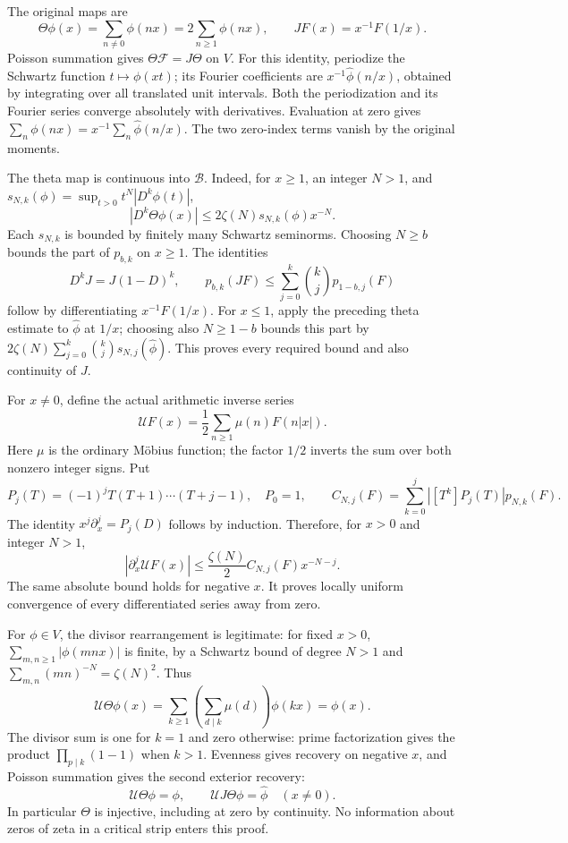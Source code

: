 \documentclass[
  11pt,
]{article}
\begin{document}
The original maps are \[
\Theta\phi(x)=\sum_{n\ne0}\phi(nx)=2\sum_{n\ge1}\phi(nx),
\qquad JF(x)=x^{-1}F(1/x).
\] Poisson summation gives \(\Theta\mathcal F=J\Theta\) on \(V\). For
this identity, periodize the Schwartz function \(t\mapsto\phi(xt)\); its
Fourier coefficients are \(x^{-1}\widehat\phi(n/x)\), obtained by
integrating over all translated unit intervals. Both the periodization
and its Fourier series converge absolutely with derivatives. Evaluation
at zero gives \(\sum_n\phi(nx)=x^{-1}\sum_n\widehat\phi(n/x)\). The two
zero-index terms vanish by the original moments.

The theta map is continuous into \(\mathscr B\). Indeed, for \(x\ge1\),
an integer \(N>1\), and \(s_{N,k}(\phi)=\sup_{t>0}t^N|D^k\phi(t)|\), \[
|D^k\Theta\phi(x)|
\le2\zeta(N)s_{N,k}(\phi)x^{-N}.
\] Each \(s_{N,k}\) is bounded by finitely many Schwartz seminorms.
Choosing \(N\ge b\) bounds the part of \(p_{b,k}\) on \(x\ge1\). The
identities \[
D^kJ=J(1-D)^k,\qquad
p_{b,k}(JF)\le\sum_{j=0}^k\binom{k}{j}p_{1-b,j}(F)
\] follow by differentiating \(x^{-1}F(1/x)\). For \(x\le1\), apply the
preceding theta estimate to \(\widehat\phi\) at \(1/x\); choosing also
\(N\ge1-b\) bounds this part by
\(2\zeta(N)\sum_{j=0}^k\binom{k}{j}s_{N,j}(\widehat\phi)\). This proves
every required bound and also continuity of \(J\).

For \(x\ne0\), define the actual arithmetic inverse series \[
\mathcal UF(x)=\frac12\sum_{n\ge1}\mu(n)F(n|x|).
\] Here \(\mu\) is the ordinary Möbius function; the factor \(1/2\)
inverts the sum over both nonzero integer signs. Put \[
P_j(T)=(-1)^jT(T+1)\cdots(T+j-1),\quad P_0=1,\qquad
C_{N,j}(F)=\sum_{k=0}^j|[T^k]P_j(T)|p_{N,k}(F).
\] The identity \(x^j\partial_x^j=P_j(D)\) follows by induction.
Therefore, for \(x>0\) and integer \(N>1\), \[
|\partial_x^j\mathcal UF(x)|
\le\frac{\zeta(N)}2C_{N,j}(F)x^{-N-j}.                 \tag{1}
\] The same absolute bound holds for negative \(x\). It proves locally
uniform convergence of every differentiated series away from zero.

For \(\phi\in V\), the divisor rearrangement is legitimate: for fixed
\(x>0\), \(\sum_{m,n\ge1}|\phi(mnx)|\) is finite, by a Schwartz bound of
degree \(N>1\) and \(\sum_{m,n}(mn)^{-N}=\zeta(N)^2\). Thus \[
\mathcal U\Theta\phi(x)
=\sum_{k\ge1}\left(\sum_{d\mid k}\mu(d)\right)\phi(kx)
=\phi(x).
\] The divisor sum is one for \(k=1\) and zero otherwise: prime
factorization gives the product \(\prod_{p\mid k}(1-1)\) when \(k>1\).
Evenness gives recovery on negative \(x\), and Poisson summation gives
the second exterior recovery: \[
\boxed{\mathcal U\Theta\phi=\phi,\qquad
\mathcal UJ\Theta\phi=\widehat\phi\quad(x\ne0).}         \tag{2}
\] In particular \(\Theta\) is injective, including at zero by
continuity. No information about zeros of zeta in a critical strip
enters this proof.
\end{document}
